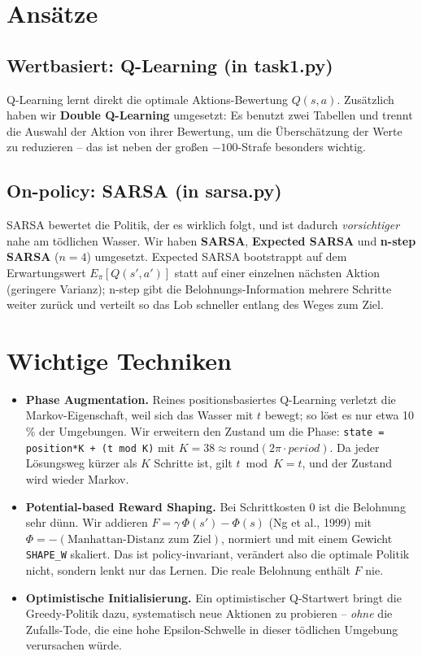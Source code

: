 \documentclass[11pt,a4paper]{article}
\begin{document}
\section{Ans\"atze}
\subsection{Wertbasiert: Q-Learning (in task1.py)}
Q-Learning lernt direkt die optimale Aktions-Bewertung $Q(s,a)$. Zus\"atzlich haben
wir \textbf{Double Q-Learning} umgesetzt: Es benutzt zwei Tabellen und trennt die
Auswahl der Aktion von ihrer Bewertung, um die \"Ubersch\"atzung der Werte zu
reduzieren -- das ist neben der gro\ss en $-100$-Strafe besonders wichtig.

\subsection{On-policy: SARSA (in sarsa.py)}
SARSA bewertet die Politik, der es wirklich folgt, und ist dadurch \emph{vorsichtiger}
nahe am t\"odlichen Wasser. Wir haben \textbf{SARSA}, \textbf{Expected SARSA} und
\textbf{n-step SARSA} ($n=4$) umgesetzt. Expected SARSA bootstrappt auf dem Erwartungswert
$E_\pi[Q(s',a')]$ statt auf einer einzelnen n\"achsten Aktion (geringere Varianz); n-step
gibt die Belohnungs-Information mehrere Schritte weiter zur\"uck und verteilt so das Lob
schneller entlang des Weges zum Ziel.

\section{Wichtige Techniken}
\begin{itemize}
  \item \textbf{Phase Augmentation.} Reines positionsbasiertes Q-Learning verletzt
        die Markov-Eigenschaft, weil sich das Wasser mit $t$ bewegt; so l\"ost es nur
        etwa 10\,\% der Umgebungen. Wir erweitern den Zustand um die Phase:
        \texttt{state = position*K + (t mod K)} mit $K=38 \approx \mathrm{round}(2\pi\cdot period)$.
        Da jeder L\"osungsweg k\"urzer als $K$ Schritte ist, gilt $t \bmod K = t$, und
        der Zustand wird wieder Markov.
  \item \textbf{Potential-based Reward Shaping.} Bei Schrittkosten $0$ ist die
        Belohnung sehr d\"unn. Wir addieren $F = \gamma\,\Phi(s') - \Phi(s)$
        (Ng et al., 1999) mit $\Phi = -(\text{Manhattan-Distanz zum Ziel})$, normiert
        und mit einem Gewicht \texttt{SHAPE\_W} skaliert. Das ist policy-invariant,
        ver\"andert also die optimale Politik nicht, sondern lenkt nur das Lernen.
        Die reale Belohnung enth\"alt $F$ nie.
  \item \textbf{Optimistische Initialisierung.} Ein optimistischer Q-Startwert bringt
        die Greedy-Politik dazu, systematisch neue Aktionen zu probieren -- \emph{ohne}
        die Zufalls-Tode, die eine hohe Epsilon-Schwelle in dieser t\"odlichen Umgebung
        verursachen w\"urde.
\end{itemize}
\end{document}

